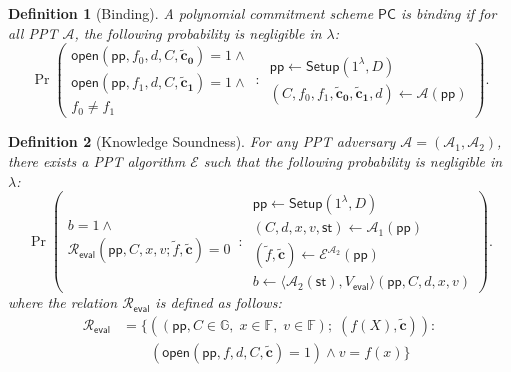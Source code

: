 \documentclass[sigconf]{acmart}
\newtheorem{definition}{Definition}[section]
\newcommand{\F}{\mathbb{F}}
\newcommand{\pp}{\mathsf{pp}}
\newcommand{\Adv}{\ensuremath{\mathcal{A}}}
\newcommand{\R}{\mathcal{R}}
\newcommand{\ext}{\ensuremath{\mathcal{E}}}
\newcommand{\pc}{\mathsf{PC}}
\newcommand{\pcsetup}{\mathsf{Setup}}
\newcommand{\pcopen}{\mathsf{open}}
\newcommand{\pceval}{\mathsf{eval}}
\newcommand{\pccheck}{\mathsf{check}}
\newcommand{\secp}{\ensuremath{\lambda}}
\begin{document}
		\begin{definition}[Binding] 
			\label{def:pcs-binding-app}
			A polynomial commitment scheme $\pc$ is binding if for all PPT $\Adv$, the following probability is negligible in $\secp$:
			\[
			\Pr \left( 
			\begin{matrix}
				\pcopen(\pp,f_0,d,C,\mathbf{\tilde{c}_0}) =1 \wedge \\
				\pcopen(\pp,f_1,d,C,\mathbf{\tilde{c}_1}) = 1 \wedge \\
				f_0 \neq f_1
			\end{matrix}
			\,:\,
			\begin{matrix}
				\pp \leftarrow \pcsetup(1^\secp,D) \\
				(C,f_0,f_1,\mathbf{\tilde{c}_0}, \mathbf{\tilde{c}_1},d) \leftarrow \Adv(\pp) 
			\end{matrix}
			\right).
			\]
		\end{definition}
		
		\begin{definition}[Knowledge Soundness]
			\label{def:pcs-ext-app}
			For any PPT adversary $\Adv = (\Adv_{1},\Adv_{2})$, there exists a PPT algorithm $\ext$ such that the following probability is negligible in $\secp$:
			\[
			\Pr\left(
			\begin{matrix}
				b = 1 \wedge \\
				\R_{\pceval}(\pp,C,x,v; \tilde{f},\mathbf{\tilde{c}}) = 0
			\end{matrix}
			\,:\,
			\begin{matrix}
				\pp \leftarrow \pcsetup(1^\secp,D) \\
				(C,d,x,v,\mathsf{st}) \leftarrow \Adv_{1}(\pp) \\
				(\tilde{f},\mathbf{\tilde{c}}) \leftarrow \ext^{\Adv_{2}}(\pp)\\
				b \leftarrow \langle \Adv_{2}(\mathsf{st}), V_{\mathsf{eval}} \rangle(\pp,C,d,x,v)
			\end{matrix}
			\right).
			\]
			where the relation $\R_{\pceval}$ is defined as follows:
			\begin{align*}
				\R_{\pceval} &= \{\left((\pp,C \in \mathbb{G},\; x \in \F, \; v \in \F);\; (f(X), \mathbf{\tilde{c}}) \right) : \\
				&\qquad (
				\pcopen(\pp,f,d,C,\mathbf{\tilde{c}}) = 1 )
				\land v = f(x)  \}
			\end{align*} 
			
		\end{definition}
		
\end{document}
